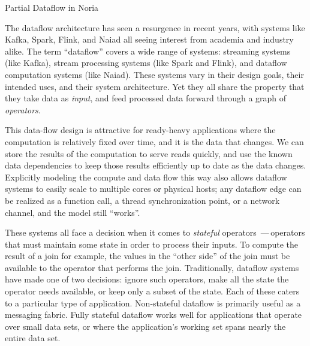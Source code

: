 \documentclass[fontsize=12pt,paper=letter]{scrartcl}
\begin{document}





\begin{center}
  \Large Partial Dataflow in Noria
\end{center}

\vspace{0.3in}
\noindent
The dataflow architecture has seen a resurgence in recent years, with systems
like Kafka\cite{kafka}, Spark\cite{spark,spark-streaming}, Flink\cite{flink}, and
Naiad\cite{naiad} all seeing interest from academia and industry alike. The term
``dataflow'' covers a wide range of systems: streaming systems (like Kafka),
stream processing systems (like Spark and Flink), and dataflow computation
systems (like Naiad). These systems vary in their design goals, their intended
uses, and their system architecture. Yet they all share the property that they
take data as \emph{input}, and feed processed data forward through a graph of
\emph{operators}.

This data-flow design is attractive for ready-heavy applications where the
computation is relatively fixed over time, and it is the data that changes.
We can store the results of the computation to serve reads quickly, and use the
known data dependencies to keep those results efficiently up to date as the data
changes. Explicitly modeling the compute and data flow this way also allows
dataflow systems to easily scale to multiple cores or physical hosts; any
dataflow edge can be realized as a function call, a thread synchronization
point, or a network channel, and the model still ``works''.

These systems all face a decision when it comes to \emph{stateful} operators\,
---\,operators that must maintain some state in order to process their inputs.
To compute the result of a join for example, the values in the ``other side'' of
the join must be available to the operator that performs the join.
Traditionally, dataflow systems have made one of two decisions: ignore such
operators, make all the state the operator needs available, or keep only a
subset of the state. Each of these caters to a particular type of application.
Non-stateful dataflow is primarily useful as a messaging fabric. Fully stateful
dataflow works well for applications that operate over small data sets, or where
the application's working set spans nearly the entire data set.
\end{document}
